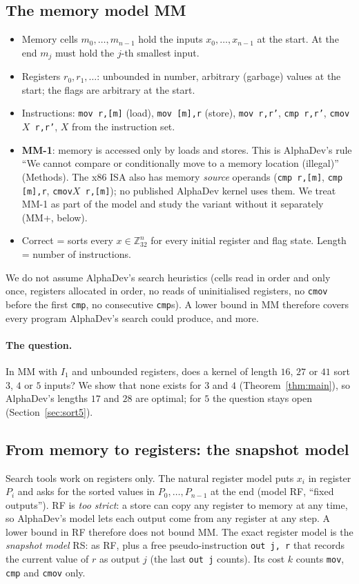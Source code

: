 \subsection{The memory model MM}
\begin{itemize}
\item Memory cells $m_0, \dots, m_{n-1}$ hold the inputs $x_0, \dots, x_{n-1}$ at the start. At the end $m_j$ must hold the
$j$-th smallest input.
\item Registers $r_0, r_1, \dots$: unbounded in number, arbitrary (garbage) values at the start; the flags are arbitrary at the
start.
\item Instructions: \texttt{mov r,[m]} (load), \texttt{mov [m],r} (store), \texttt{mov r,r'}, \texttt{cmp r,r'},
\texttt{cmov}$X$\texttt{ r,r'}, $X$ from the instruction set.
\item \textbf{MM-1}: memory is accessed only by loads and stores. This is AlphaDev's rule ``We cannot compare or conditionally
move to a memory location (illegal)'' (Methods). The x86 ISA also has memory \emph{source} operands (\texttt{cmp r,[m]},
\texttt{cmp [m],r}, \texttt{cmov}$X$\texttt{ r,[m]}); no published AlphaDev kernel uses them. We treat MM-1 as part of the
model and study the variant without it separately (MM+, below).
\item Correct = sorts every $x \in \mathbb{Z}_{32}^n$ for every initial register and flag state. Length = number of
instructions.
\end{itemize}
We do not assume AlphaDev's search heuristics (cells read in order and only once, registers allocated in order, no reads of
uninitialised registers, no \texttt{cmov} before the first \texttt{cmp}, no consecutive \texttt{cmp}s). A lower bound in MM
therefore covers every program AlphaDev's search could produce, and more.

\paragraph{The question.} In MM with $I_1$ and unbounded registers, does a kernel of length $16$, $27$ or $41$ sort $3$, $4$
or $5$ inputs? We show that none exists for $3$ and $4$ (Theorem~\ref{thm:main}), so AlphaDev's lengths $17$ and $28$ are
optimal; for $5$ the question stays open (Section~\ref{sec:sort5}).

\subsection{From memory to registers: the snapshot model}
Search tools work on registers only. The natural register model puts $x_i$ in register $P_i$ and asks for the sorted values
in $P_0, \dots, P_{n-1}$ at the end (model RF, ``fixed outputs''). RF is \emph{too strict}: a store can copy any register to
memory at any time, so AlphaDev's model lets each output come from any register at any step. A lower bound in RF therefore
does not bound MM. The exact register model is the \emph{snapshot model} RS: as RF, plus a free pseudo-instruction
\texttt{out j, r} that records the current value of $r$ as output $j$ (the last \texttt{out j} counts). Its cost $k$ counts
\texttt{mov}, \texttt{cmp} and \texttt{cmov} only.

